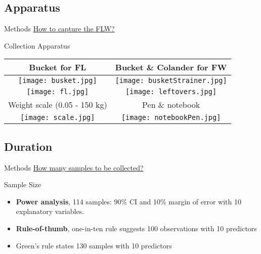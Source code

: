 \documentclass{beamer}\usepackage[]{graphicx}\usepackage[]{xcolor}
\begin{document}
\subsection{Apparatus}
\begin{frame}{Methods}
    \underline{How to capture the FLW?}
    \begin{block}{Collection Apparatus}
            \begin{tabular}{cc}
                    Bucket for FL & Bucket \& Colander for FW \\ \hline
                    \texttt{[image: busket.jpg]}
                    & 
                    \texttt{[image: busketStrainer.jpg]}\\
                    \texttt{[image: fl.jpg]}
                    & 
                    \texttt{[image: leftovers.jpg]}\\
                    \hline
                    Weight scale (0.05 - 150 kg) & Pen \& notebook\\ %
                    \texttt{[image: scale.jpg]}
                    & 
                    \texttt{[image: notebookPen.jpg]}
            \end{tabular}
    \end{block}
\end{frame}

\subsection{Duration}
\begin{frame}{Methods}
    \underline{How many samples to be collected?}
    \begin{block}{Sample Size}
        \begin{itemize}
            \item \textbf{Power analysis}, 
            114 samples: 90\% CI and 10\% margin of error with 10 explanatory variables.
            \item \textbf{Rule-of-thumb}, one-in-ten rule suggests 100 observations with 10 predictors\cite{Harrell1984-te}
            \item Green's rule states 130 samples with 10 predictors\cite{Green1991-aj}
        \end{itemize}
    \end{block}
\end{frame}
\end{document}
